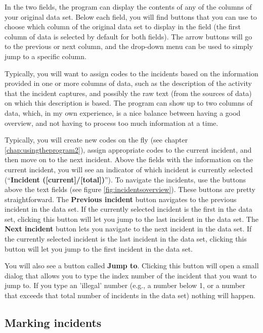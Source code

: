 \documentclass{memoir}
\begin{document}
In the two fields, the program can display the contents of any of the columns of your original data set. Below each field, you will find buttons that you can use to choose which column of the original data set to display in the field (the first column of data is selected by default for both fields). The arrow buttons will go to the previous or next column, and the drop-down menu can be used to simply jump to a specific column. 

Typically, you will want to assign codes to the incidents based on the information provided in one or more columns of data, such as the description of the activity that the incident captures, and possibly the raw text (from the sources of data) on which this description is based. The program can show up to two columns of data, which, in my own experience, is a nice balance between having a good overview, and not having to process too much information at a time.

Typically, you will create new codes on the fly (see chapter \ref{chap:usingtheprogram2}), assign appropriate codes to the current incident, and then move on to the next incident. Above the fields with the information on the current incident, you will see an indicator of which incident is currently selected (``\textbf{Incident ([current]/[total])}''). To navigate the incidents, use the buttons above the text fields (see figure \ref{fig:incidentsoverview}). These buttons are pretty straightforward. The \textbf{Previous incident} button navigates to the previous incident in the data set. If the currently selected incident is the first in the data set, clicking this button will let you jump to the last incident in the data set. The \textbf{Next incident} button lets you navigate to the next incident in the data set. If the currently selected incident is the last incident in the data set, clicking this button will let you jump to the first incident in the data set.

You will also see a button called \textbf{Jump to}. Clicking this button will open a small dialog that allows you to type the index number of the incident that you want to jump to. If you type an 'illegal' number (e.g., a number below 1, or a number that exceeds that total number of incidents in the data set) nothing will happen. 

\subsection{Marking incidents}
\label{sec:markingincidents}
\end{document}
